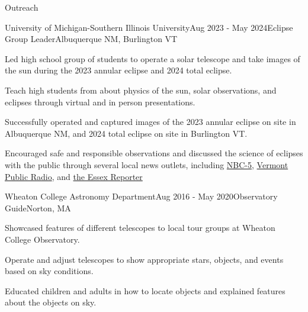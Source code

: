 \documentclass{resume} %
\begin{document}
\begin{rSection}{Outreach}

\begin{rSubsection}{University of Michigan-Southern Illinois University}{Aug 2023 - May 2024}{Eclipse Group Leader}{Albuquerque NM, Burlington VT}
    \item Led high school group of students to operate a solar telescope and take images of the sun during the 2023 annular eclipse and 2024 total eclipse.
    \item Teach high students from about physics of the sun, solar observations, and eclipses through virtual and in person presentations.
    \item Successfully operated and captured images of the 2023 annular eclipse on site in Albuquerque NM, and 2024 total eclipse on site in Burlington VT.
    \item Encouraged safe and responsible observations and discussed the science of eclipses with the public through several local news outlets, including \href{https://www.mynbc5.com/article/total-eclipse-nasa/60433342?utm_campaign=snd-autopilot}{NBC-5}, \href{https://www.vermontpublic.org/local-news/2024-04-10/nasa-volunteer-photo-eclipse-burlington-sun-atmosphere}{Vermont Public Radio}, and \href{https://www.essexreporter.com/news/physics-masters-student-collects-data-for-nasa-and-national-science-foundation-from-eclipse-in-burlington/article_1b7a72a8-76d5-52b7-8ffa-886491f640a4.html}{the Essex Reporter}
\end{rSubsection}



\begin{rSubsection}{Wheaton College Astronomy Department}{Aug 2016 - May 2020}{Observatory Guide}{Norton, MA}
    \item Showcased features of different telescopes to local tour groups at Wheaton College Observatory.
    \item Operate and adjust telescopes to show appropriate stars, objects, and events based on sky conditions.
    \item Educated children and adults in how to locate objects and explained features about the objects on sky.

\end{rSubsection}
\end{rSection}
\end{document}
